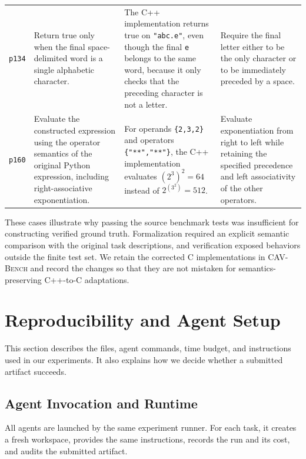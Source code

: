 \begin{table}[!t]
\begin{tabular}{L{0.07\textwidth}L{0.19\textwidth}L{0.31\textwidth}L{0.36\textwidth}}
\texttt{p134} & Return true only when the final space-delimited word is a single
alphabetic character. & The C++ implementation returns true on
\texttt{"abc.e"}, even though the final \texttt{e} belongs to the same word,
because it only checks that the preceding character is not a letter. & Require
the final letter either to be the only character or to be immediately preceded
by a space. \\

\texttt{p160} & Evaluate the constructed expression using the operator
semantics of the original Python expression, including right-associative
exponentiation. & For operands \texttt{\{2,3,2\}} and operators
\texttt{\{"**","**"\}}, the C++ implementation evaluates
$(2^3)^2=64$ instead of $2^{(3^2)}=512$. & Evaluate exponentiation from right
to left while retaining the specified precedence and left associativity of the
other operators. \\
\bottomrule
\end{tabular}
\vspace{-6pt}
\end{table}

These cases illustrate why passing the source benchmark tests was insufficient
for constructing verified ground truth. Formalization required an explicit
semantic comparison with the original task descriptions, and verification
exposed behaviors outside the finite test set. We retain the corrected C
implementations in \textsc{CAV-Bench} and record the changes so that they are
not mistaken for semantics-preserving C++-to-C adaptations.

\section{Reproducibility and Agent Setup}
\label{app:reproducibility}

This section describes the files, agent commands, time budget, and instructions used in our experiments. It also explains how we decide whether a submitted artifact succeeds.

\subsection{Agent Invocation and Runtime}
\label{app:agent-runtime}

All agents are launched by the same experiment runner. For each task, it creates a fresh workspace, provides the same instructions, records the run and its cost, and audits the submitted artifact.

